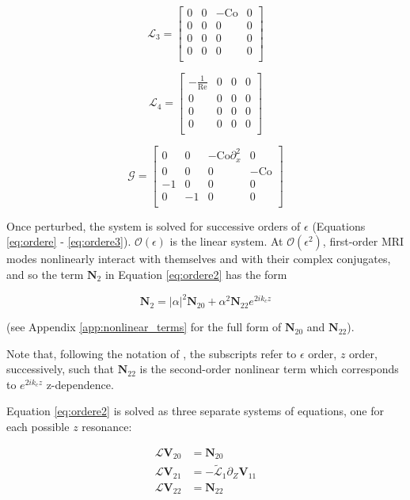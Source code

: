 \documentclass[twocolumn]{aastex61}
\newcommand{\beq}{\begin{equation}}
\newcommand{\eeq}{\end{equation}}
\newcommand\reye{\mathrm{Re}}
\newcommand{\Co}{\mathrm{Co}}
\begin{document}
\beq
\mathcal{L}_3 = \left[\begin{matrix}
0 & 0 & -\Co & 0 \\
0 & 0 & 0 & 0 \\
0 & 0 & 0 & 0 \\
0 & 0 & 0 & 0 \\ \end{matrix} \right]
\eeq

\beq
\mathcal{L}_4 = \left[\begin{matrix}
-\frac{1}{\reye} & 0 & 0 & 0 \\
0 & 0 & 0 & 0 \\
0 & 0 & 0 & 0 \\
0 & 0 & 0 & 0 \\ \end{matrix}\right] 
\eeq

\beq
\mathcal{G} = \left[\begin{matrix}
0 & 0 & -\Co\partial_x^2 & 0 \\
0 & 0 & 0 & -\Co \\
-1 & 0 & 0 & 0 \\
0 & -1 & 0 & 0 \\ \end{matrix} \right]
\eeq

Once perturbed, the system is solved for successive orders of $\epsilon$ (Equations \ref{eq:ordere} - \ref{eq:ordere3}). $\mathcal{O}(\epsilon)$ is the linear system. At $\mathcal{O}(\epsilon^2)$, first-order MRI modes nonlinearly interact with themselves and with their complex conjugates, and so the term $\mathbf{N}_2$ in Equation \ref{eq:ordere2} has the form

\beq
\mathbf{N}_2 = |\alpha|^2 \mathbf{N}_{20} + \alpha^2 \mathbf{N}_{22} e^{2 i k_c z}
\eeq

(see Appendix \ref{app:nonlinear_terms} for the full form of $\mathbf{N}_{20}$ and $\mathbf{N}_{22}$). 

Note that, following the notation of \citet{Umurhan:2007hs}, the subscripts refer to $\epsilon$ order, $z$ order, successively, such that $\mathbf{N}_{22}$ is the second-order nonlinear term which corresponds to $e^{2 i k_c z}$ z-dependence.  

Equation \ref{eq:ordere2} is solved as three separate systems of equations, one for each possible $z$ resonance: 

\begin{align}
\mathcal{L}\mathbf{V}_{20} & = \mathbf{N}_{20}\\
\mathcal{L}\mathbf{V}_{21} & = - \widetilde{\mathcal{L}}_1 \partial_Z \mathbf{V}_{11} \\
\mathcal{L}\mathbf{V}_{22} & = \mathbf{N}_{22}
\end{align}
\end{document}
